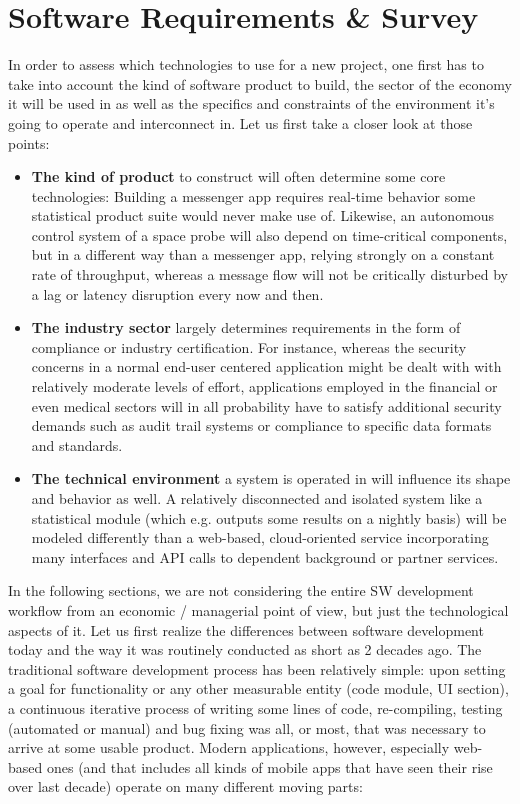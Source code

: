 \chapter{Software Requirements \& Survey}
\label{ch:software_requirements}

In order to assess which technologies to use for a new project, one first has to take into account the kind of software product to build, the sector of the economy it will be used in as well as the specifics and constraints of the environment it's going to operate and interconnect in. Let us first take a closer look at those points:

\begin{itemize}
	\item \textbf{The kind of product} to construct will often determine some core technologies: Building a messenger app requires real-time behavior some statistical product suite would never make use of. Likewise, an autonomous control system of a space probe will also depend on time-critical components, but in a different way than a messenger app, relying strongly on a constant rate of throughput, whereas a message flow will not be critically disturbed by a lag or latency disruption every now and then.
	\item \textbf{The industry sector} largely determines requirements in the form of compliance or industry certification. For instance, whereas the security concerns in a normal end-user centered application might be dealt with with relatively moderate levels of effort, applications employed in the financial or even medical sectors will in all probability have to satisfy additional security demands such as audit trail systems or compliance to specific data formats and standards.
	\item \textbf{The technical environment} a system is operated in will influence its shape and behavior as well. A relatively disconnected and isolated system like a statistical module (which e.g. outputs some results on a nightly basis) will be modeled differently than a web-based, cloud-oriented service incorporating many interfaces and API calls to dependent background or partner services.
\end{itemize}

In the following sections, we are not considering the entire SW development workflow from an economic / managerial point of view, but just the technological aspects of it. Let us first realize the differences between software development today and the way it was routinely conducted as short as 2 decades ago. The traditional software development process has been relatively simple: upon setting a goal for functionality or any other measurable entity (code module, UI section), a continuous iterative process of writing some lines of code, re-compiling, testing (automated or manual) and bug fixing was all, or most, that was necessary to arrive at some usable product. Modern applications, however, especially web-based ones (and that includes all kinds of mobile apps that have seen their rise over last decade) operate on many different moving parts:

